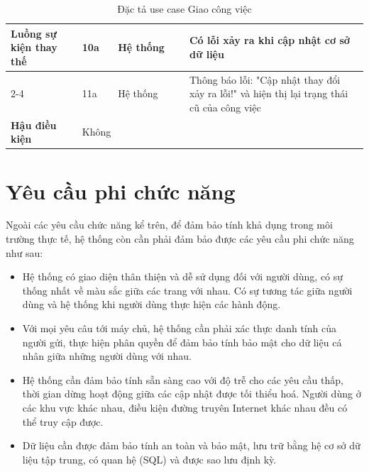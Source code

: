 \documentclass[../DoAn.tex]{subfiles}
\begin{document}
\begin{table}[ht]
\begin{tabular}{| p{0.2\linewidth} | p{0.1\linewidth} | p{0.2\linewidth} | p{0.5\linewidth} |}
        \multirow{4}{\linewidth}{\textbf{Luồng sự kiện thay thế}}    & \multicolumn{1}{p{0.1\linewidth}|}{10a}                                                            & \multicolumn{1}{p{0.2\linewidth}|}{Hệ thống}               & \multicolumn{1}{p{0.5\linewidth}|}{Có lỗi xảy ra khi cập nhật cơ sở dữ liệu}                                                   \\ \cline{2-4}
                                                                     & \multicolumn{1}{p{0.1\linewidth}|}{11a}                                                            & \multicolumn{1}{p{0.2\linewidth}|}{Hệ thống}               & \multicolumn{1}{p{0.5\linewidth}|}{Thông báo lỗi: "Cập nhật thay đổi xảy ra lỗi!" và hiện thị lại trạng thái cũ của công việc} \\ \hline

        \textbf{Hậu điều kiện}                                       & \multicolumn{3}{p{0.1\linewidth}|}{Không}                                                                                                                                                                                                                                                        \\ \hline
    \end{tabular}%
    \renewcommand{\arraystretch}{1}
    \caption{Đặc tả use case Giao công việc}
    \label{tab:UC04}
\end{table}

\newpage

\section{Yêu cầu phi chức năng}
\label{section:2.4}

Ngoài các yêu cầu chức năng kể trên, để đảm bảo tính khả dụng trong môi trường thực tế, hệ thống còn cần phải đảm bảo được các yêu cầu phi chức năng
như sau:

\begin{itemize}
    \item Hệ thống có giao diện thân thiện và dễ sử dụng đối với người dùng, có sự thống nhất về màu sắc giữa các trang với nhau.
          Có sự tương tác giữa người dùng và hệ thống khi người dùng thực hiện các hành động.
    \item Với mọi yêu câu tới máy chủ, hệ thống cần phải xác thực danh tính của người gửi, thực hiện phân quyền để đảm bảo tính bảo mật cho
          dữ liệu cá nhân giữa những người dùng với nhau.
    \item Hệ thống cần đảm bảo tính sẵn sàng cao với độ trễ cho các yêu cầu thấp, thời gian dừng hoạt động giữa các cập nhật được tối thiểu hoá.
          Người dùng ở các khu vực khác nhau, điều kiện đường truyên Internet khác nhau đều có thể truy cập được.
    \item Dữ liệu cần được đảm bảo tính an toàn và bảo mật, lưu trữ bằng hệ cơ sở dữ liệu tập trung, có quan hệ (SQL) và được sao lưu định kỳ.
\end{itemize}

\end{document}
